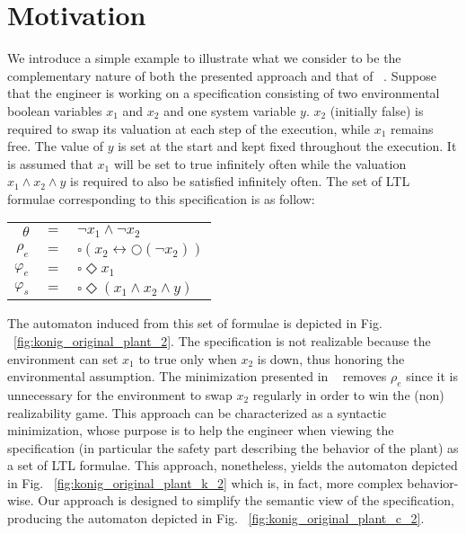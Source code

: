 \clearpage
\section{Motivation}\label{sec:motivation}

We introduce a simple example to illustrate what we consider to be the complementary nature 
of both the presented approach and that of ~\cite{DBLP:conf/hvc/KonighoferHB10}. Suppose that the engineer is working on a specification consisting of two environmental boolean variables $x_1$ and $x_2$ and one system variable $y$. $x_2$ (initially false) is required to swap its valuation at each step of the execution, while $x_1$ remains free. The value of $y$ is set at the start and kept fixed throughout the execution.
It is assumed that $x_1$ will be set to true infinitely often while the valuation $x_1 \wedge x_2 \wedge y$ is required to also be satisfied infinitely often. The set of LTL formulae corresponding to this specification is as follow: 
\begin{center}
	\begin{tabular}{ r c l }
		$\theta$& $=$ &$\neg x_1 \wedge \neg x_2$\\
		$\rho_e$& $=$ &$\square(x_2 \leftrightarrow \bigcirc(\neg x_2))$\\
		$\varphi_e$& $=$ &$\square \Diamond x_1$\\
		$\varphi_s$& $=$ &$\square \Diamond (x_1 \wedge x_2 \wedge y)$\\
	\end{tabular}
\end{center}

The automaton induced from this set of formulae is depicted in Fig. ~\ref{fig:konig_original_plant_2}. The specification is not realizable because the environment can set $x_1$ to true only when $x_2$ is down, thus honoring the environmental assumption. The minimization presented in ~\cite{DBLP:conf/hvc/KonighoferHB10} removes $\rho_e$ since it is unnecessary for the environment to swap $x_2$ regularly in order to win the (non) realizability game. This approach can be characterized as a syntactic minimization, whose purpose is to help the engineer when viewing the specification (in particular the safety part describing the behavior of the plant) as a set of LTL formulae. This approach, nonetheless, yields the automaton depicted in Fig. ~\ref{fig:konig_original_plant_k_2} which is, in fact, more complex behavior-wise. Our approach is designed to simplify the semantic view of the specification, producing the automaton depicted in Fig. ~\ref{fig:konig_original_plant_c_2}. 

